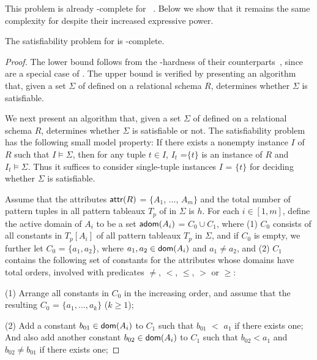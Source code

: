 This problem is already \NP-complete for \CFDs~\cite{CFDs}.
Below we show that it remains the
same complexity for \pCFDs despite their increased
expressive power.

\begin{prop}
\label{thm-sat-pcfd-fin} The satisfiability problem for \pCFDs is
\NP-complete.
\end{prop}

\begin{proof} The lower bound follows from the \NP-hardness of their \CFDs
counterparts~\cite{CFDs}, since \CFDs are a special case of \pCFDs.
The upper bound is verified by presenting an \NP algorithm that,
given a set $\Sigma$ of \pCFDs defined on a relational schema $R$,
determines whether $\Sigma$ is satisfiable.

We next present an \NP
algorithm that, given a set $\Sigma$ of \pCFDs defined on a
relational schema $R$, determines whether $\Sigma$ is satisfiable or not.
The satisfiability problem has the following small model property:
If there exists a nonempty instance $I$ of $R$ such that
$I\models\Sigma$, then for any tuple $t\in I$, $I_t$ =$\{t\}$ is an
instance of $R$ and $I_t\models\Sigma$. Thus it suffices to consider
single-tuple instances $I$ = $\{t\}$ for deciding whether $\Sigma$
is satisfiable.

Assume \kwlog that the attributes $\protect\mathsf{attr}(R)$ = $\{A_1$, $\dots$,
$A_m\}$ and the total number of pattern tuples in all pattern
tableaux $T_p$ of \pCFDs in $\Sigma$ is $h$. For each $i\in [1, m]$, define
the active domain of $A_i$ to be a set ${\mathsf{adom}}(A_i)$ = $C_0\cup C_1$,
where (1) $C_0$ consists of all constants in $T_p[A_i]$ of all
pattern tableaux $T_p$ in $\Sigma$, and if $C_0$ is empty, we further let $C_0$ = $\{a_1, a_2\}$, where
$a_1, a_2 \in\protect\mathsf{dom}(A_i)$ and $a_1\ne a_2$, and (2) $C_1$ contains the
following set of constants for the attributes whose domains have
total orders, \ie involved with predicates $\ne$, $<$, $\le$, $>$ or $\ge$:


\bi
\item[(1)] Arrange all constants in $C_0$ in the increasing order, and
assume that the resulting $C_0$ = $\{a_1, \ldots, a_k\}$ ($k\ge 1$);

\item[(2)] Add a constant $b_{01}\in\protect\mathsf{dom}(A_i)$ to $C_1$ such that $b_{01}$ $<$ $a_1$ if there
exists one; And also add another constant $b_{02}\in\protect\mathsf{dom}(A_i)$ to $C_1$
such that $b_{02} < a_1$ and $b_{02}\ne b_{01}$ if there exists one;


\end{proof}
